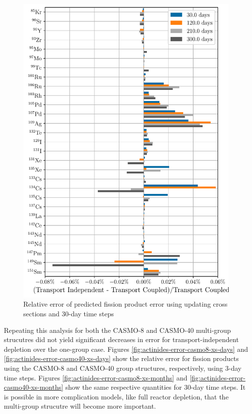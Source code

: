     \begin{figure}[htpb]
        \centering
        \includegraphics[width=\linewidth]{figs/fission_products_updating_xs_predictor_fission_q_months.pdf}
        \caption{Relative error of predicted fission product error using
        updating cross sections and 30-day time steps}
        \label{fig:fp-error-updating-xs-months}
    \end{figure}


    Repeating this analysis for both the CASMO-8 and CASMO-40 multi-group
    strucutres did not yield significant decreases in error for
    transport-independent depletion over the one-group case.  Figures
    \ref{fig:actinides-error-casmo8-xs-days} and
    \ref{fig:actinides-error-casmo40-xs-days} show the relative error for
    fission products using the CASMO-8 and CASMO-40 group structures,
    respectively, using 3-day time steps. Figures
    \ref{fig:actinides-error-casmo8-xs-months} and
    \ref{fig:actinides-error-casmo40-xs-months} show the same respective
    quantities for 30-day time steps.  It is possible in more complication
    models, like full reactor depletion, that the multi-group strucutre will
    become more important. 

